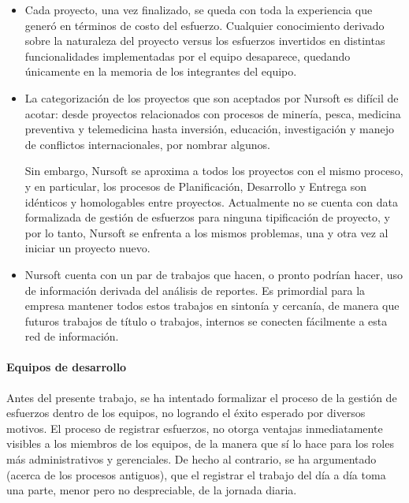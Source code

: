 \begin{itemize}
  \item Cada proyecto, una vez finalizado, se queda con toda la experiencia que generó
  en términos de costo del esfuerzo. Cualquier conocimiento derivado sobre
  la naturaleza del proyecto versus los esfuerzos invertidos en distintas 
  funcionalidades implementadas por el equipo desaparece, quedando únicamente en
  la memoria de los integrantes del equipo. 
  \item La categorización de los proyectos que son aceptados por Nursoft es 
  difícil de acotar: desde proyectos relacionados con procesos de minería, pesca,
  medicina preventiva y telemedicina hasta inversión, educación, investigación y
  manejo de conflictos internacionales, por nombrar algunos. 

  Sin embargo, Nursoft se aproxima a todos los proyectos con el mismo proceso,
  y en particular, los procesos de Planificación, Desarrollo y Entrega son 
  idénticos y homologables entre proyectos. Actualmente no se cuenta con data
  formalizada de gestión de esfuerzos para ninguna tipificación de proyecto, y
  por lo tanto, Nursoft se enfrenta a los mismos problemas, una y otra vez al iniciar un
  proyecto nuevo.
  \item Nursoft cuenta con un par de trabajos\cite{morales_2019}\cite{mas'ad_2019} que hacen,
  o pronto podrían hacer, uso de información derivada del análisis de reportes.
  Es primordial para la empresa mantener todos estos trabajos en sintonía y cercanía,
  de manera que futuros trabajos de título o trabajos, internos se conecten
  fácilmente a esta red de información.
  
\end{itemize}

\paragraph{Equipos de desarrollo}

Antes del presente trabajo, se ha intentado formalizar el proceso de la gestión
de esfuerzos dentro de los equipos, no logrando el éxito esperado por diversos
motivos. El proceso de registrar esfuerzos, no otorga ventajas
inmediatamente visibles a los miembros de los equipos, de la manera que sí lo hace
para los roles más administrativos y gerenciales. De hecho al contrario, se ha
argumentado (acerca de los procesos antiguos), que el registrar el trabajo del
día a día toma una parte, menor pero no despreciable, de la jornada diaria.

